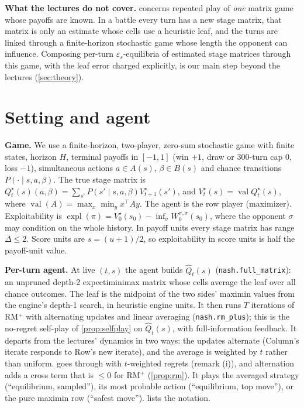 \documentclass[10pt]{article}
\theoremstyle{plain}
\theoremstyle{definition}
\theoremstyle{remark}
\newcommand{\epss}{\varepsilon_s}
\newcommand{\Qhat}{\hat Q}
\newcommand{\Qstar}{Q^\star}
\newcommand{\Vstar}{V^\star}
\DeclareMathOperator{\val}{val}
\DeclareMathOperator{\expl}{expl}
\begin{document}
\textbf{What the lectures do not cover.}  concerns repeated play of \emph{one} matrix game whose payoffs are known. In a battle every turn has a new stage matrix, that matrix is only an estimate whose cells use a heuristic leaf, and the turns are linked through a finite-horizon stochastic game whose length the opponent can influence. Composing per-turn $\epss$-equilibria of estimated stage matrices through this game, with the leaf error charged explicitly, is our main step beyond the lectures (\cref{sec:theory}).

\section{Setting and agent}
\label{sec:setting}
\textbf{Game.} We use a finite-horizon, two-player, zero-sum stochastic game with finite states, horizon $H$, terminal payoffs in $[-1,1]$ (win $+1$, draw or 300-turn cap $0$, loss $-1$), simultaneous actions $a\in A(s)$, $\beta\in B(s)$ and chance transitions $P(\cdot\mid s,a,\beta)$. The true stage matrix is $\Qstar_t(s)(a,\beta)=\sum_{s'}P(s'\mid s,a,\beta)\Vstar_{t+1}(s')$, and $\Vstar_t(s)=\val\Qstar_t(s)$, where $\val(A)=\max_x\min_y x^\top Ay$. The agent is the row player (maximizer). Exploitability is $\expl(\pi)=\Vstar_0(s_0)-\inf_\sigma W^{\pi,\sigma}_0(s_0)$, where the opponent $\sigma$ may condition on the whole history. In payoff units every stage matrix has range $\Delta\le2$. Score units are $s=(u+1)/2$, so exploitability in score units is half the payoff-unit value.

\textbf{Per-turn agent.} At live $(t,s)$ the agent builds $\Qhat_t(s)$ (\texttt{nash.full\_matrix}): an unpruned depth-2 expectiminimax matrix whose cells average the leaf over all chance outcomes. The leaf is the midpoint of the two sides' maximin values from the engine's depth-1 search, in heuristic engine units. It then runs $T$ iterations of RM$^+$ with alternating updates and linear averaging (\texttt{nash.rm\_plus}); this is the no-regret self-play of \cref{prop:selfplay} on $\Qhat_t(s)$, with full-information feedback. It departs from the lectures' dynamics in two ways: the updates alternate (Column's iterate responds to Row's new iterate), and the average is weighted by $t$ rather than uniform.  goes through with $t$-weighted regrets (remark (i)), and alternation adds a cross term that is $\le0$ for RM$^+$ (\cref{prop:rm}). It plays the averaged strategy (``equilibrium, sampled''), its most probable action (``equilibrium, top move''), or the pure maximin row (``safest move'').  lists the notation.
\end{document}
